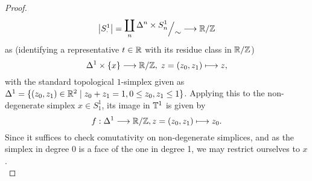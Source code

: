 \begin{proof}
	\[	\abs{S^1_\cdot} = \quotient{\coprod\limits_{n} \Delta^n \times S^1_n}{\sim} \to \bR/\bZ		\]
	as (identifying a representative $t \in \mathbb{R}$ with its residue class in $\mathbb{R}/\mathbb{Z}$)
	\[	\Delta^1 \times \{x\} \longrightarrow \mathbb{R}/\mathbb{Z},\;z = (z_0,z_1) \longmapsto z, \]
with the standard topological $1$-simplex given as $\Delta^1 = \{(z_0,z_1) \in \mathbb{R}^2 \mid z_0+z_1=1, 0 \leq z_0,z_1 \leq 1\}$. Applying this to the non-degenerate simplex $x \in S^1_1$, its image in $\mathbb{T}^1$ is given by
\[
	f:\Delta^1 \longrightarrow \mathbb{R}/\mathbb{Z}, z = (z_0,z_1) \longmapsto z_0.
\]
Since it suffices to check comutativity on non-degenerate simplices, and as the simplex in degree 0 is a face of the one in degree 1, we may restrict ourselves to $x$.\\
%
%

\end{proof}
